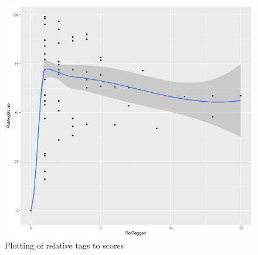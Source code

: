 \documentclass[figures_tabs.tex]{subfiles}
\begin{document}
\begin{figure}[H]
    \centering
    \includegraphics[width=\textwidth]{img/tag_score_rel.png}
    \caption{Plotting of relative tags to scores}
    \label{fig:tag_score_rel}
\end{figure}
\end{document}
